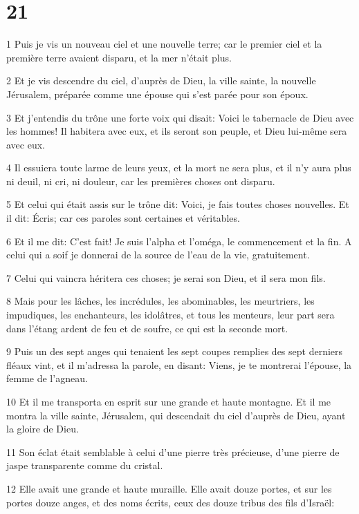 \chapter{21}

\par 1 Puis je vis un nouveau ciel et une nouvelle terre; car le premier ciel et la première terre avaient disparu, et la mer n'était plus.
\par 2 Et je vis descendre du ciel, d'auprès de Dieu, la ville sainte, la nouvelle Jérusalem, préparée comme une épouse qui s'est parée pour son époux.
\par 3 Et j'entendis du trône une forte voix qui disait: Voici le tabernacle de Dieu avec les hommes! Il habitera avec eux, et ils seront son peuple, et Dieu lui-même sera avec eux.
\par 4 Il essuiera toute larme de leurs yeux, et la mort ne sera plus, et il n'y aura plus ni deuil, ni cri, ni douleur, car les premières choses ont disparu.
\par 5 Et celui qui était assis sur le trône dit: Voici, je fais toutes choses nouvelles. Et il dit: Écris; car ces paroles sont certaines et véritables.
\par 6 Et il me dit: C'est fait! Je suis l'alpha et l'oméga, le commencement et la fin. A celui qui a soif je donnerai de la source de l'eau de la vie, gratuitement.
\par 7 Celui qui vaincra héritera ces choses; je serai son Dieu, et il sera mon fils.
\par 8 Mais pour les lâches, les incrédules, les abominables, les meurtriers, les impudiques, les enchanteurs, les idolâtres, et tous les menteurs, leur part sera dans l'étang ardent de feu et de soufre, ce qui est la seconde mort.
\par 9 Puis un des sept anges qui tenaient les sept coupes remplies des sept derniers fléaux vint, et il m'adressa la parole, en disant: Viens, je te montrerai l'épouse, la femme de l'agneau.
\par 10 Et il me transporta en esprit sur une grande et haute montagne. Et il me montra la ville sainte, Jérusalem, qui descendait du ciel d'auprès de Dieu, ayant la gloire de Dieu.
\par 11 Son éclat était semblable à celui d'une pierre très précieuse, d'une pierre de jaspe transparente comme du cristal.
\par 12 Elle avait une grande et haute muraille. Elle avait douze portes, et sur les portes douze anges, et des noms écrits, ceux des douze tribus des fils d'Israël:
